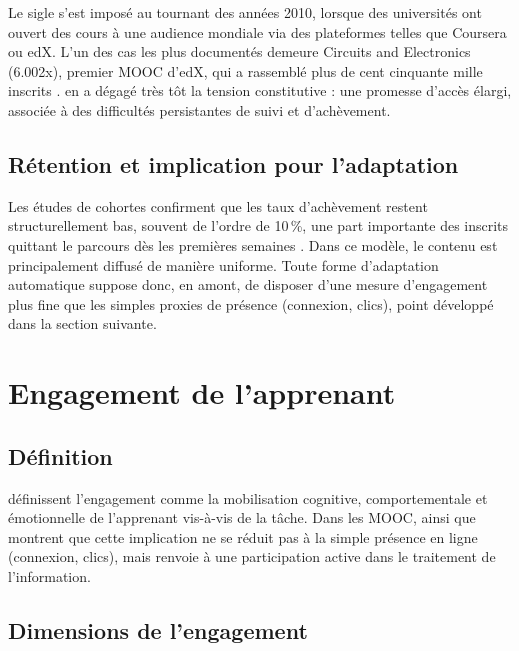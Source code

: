 Le sigle s'est imposé au tournant des années 2010, lorsque des universités
ont ouvert des cours à une audience mondiale via des plateformes telles
que Coursera ou edX. L'un des cas les plus documentés demeure Circuits and Electronics (6.002x), premier MOOC d'edX, qui a
rassemblé plus de cent cinquante mille inscrits
\cite{breslow2013studying}. \textcite{daniel2012making} en a dégagé
très tôt la tension constitutive : une promesse d'accès élargi, associée
à des difficultés persistantes de suivi et d'achèvement.

\subsection{Rétention et implication pour l'adaptation}

Les études de cohortes confirment que les taux d'achèvement restent
structurellement bas, souvent de l'ordre de 10\,\%, une part importante
des inscrits quittant le parcours dès les premières semaines
\cite{onah2014dropout,jordan2015massive,reich2019mooc}. Dans ce modèle,
le contenu est principalement diffusé de manière uniforme. Toute forme
d'adaptation automatique suppose donc, en amont, de disposer d'une
mesure d'engagement plus fine que les simples proxies de présence
(connexion, clics), point développé dans la section suivante.

\section{Engagement de l'apprenant}
\label{sec:fond-engagement}

\subsection{Définition}

\textcite{fredricks2004school} définissent
l'engagement comme la mobilisation cognitive, comportementale et
émotionnelle de l'apprenant vis-à-vis de la tâche. Dans les MOOC,
\textcite{kizilcec2013deconstructing} ainsi que
\textcite{hew2016promoting} montrent que cette implication ne se réduit
pas à la simple présence en ligne (connexion, clics), mais renvoie à une
participation active dans le traitement de l'information.

\subsection{Dimensions de l'engagement}

